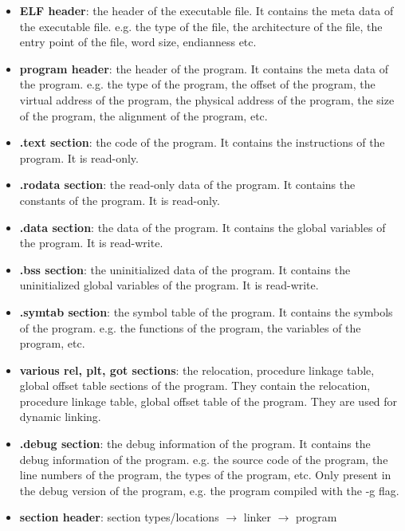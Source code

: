 \documentclass[letterpaper,12pt]{article}
\begin{document}
\begin{itemize}
    \item \textbf{ELF header}: the header of the executable file. It contains the meta data of the executable file. e.g. the type of the file, the architecture of the file, the entry point of the file, word size, endianness etc.
    \item \textbf{program header}: the header of the program. It contains the meta data of the program. e.g. the type of the program, the offset of the program, the virtual address of the program, the physical address of the program, the size of the program, the alignment of the program, etc.
    \item \textbf{.text section}: the code of the program. It contains the instructions of the program. It is read-only.
    \item \textbf{.rodata section}: the read-only data of the program. It contains the constants of the program. It is read-only.
    \item \textbf{.data section}: the data of the program. It contains the global variables of the program. It is read-write.
    \item \textbf{.bss section}: the uninitialized data of the program. It contains the uninitialized global variables of the program. It is read-write.
    \item \textbf{.symtab section}: the symbol table of the program. It contains the symbols of the program. e.g. the functions of the program, the variables of the program, etc.
    \item \textbf{various rel, plt, got sections}: the relocation, procedure linkage table, global offset table sections of the program. They contain the relocation, procedure linkage table, global offset table of the program. They are used for dynamic linking.
    \item \textbf{.debug section}: the debug information of the program. It contains the debug information of the program. e.g. the source code of the program, the line numbers of the program, the types of the program, etc. Only present in the debug version of the program, e.g. the program compiled with the -g flag.
    \item \textbf{section header}: section types/locations $\to$ linker $\to$ program
\end{itemize}
\end{document}
